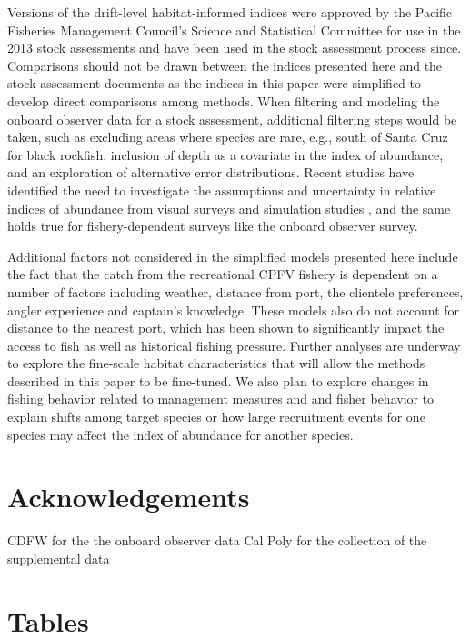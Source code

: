 \documentclass[
  12pt,
  authoryear,
  preprint,
  3p]{elsarticle}
\begin{document}
Versions of the drift-level habitat-informed indices were approved by
the Pacific Fisheries Management Council's Science and Statistical
Committee for use in the 2013 stock assessments and have been used in
the stock assessment process since. Comparisons should not be drawn
between the indices presented here and the stock assessment documents as
the indices in this paper were simplified to develop direct comparisons
among methods. When filtering and modeling the onboard observer data for
a stock assessment, additional filtering steps would be taken, such as
excluding areas where species are rare, e.g., south of Santa Cruz for
black rockfish, inclusion of depth as a covariate in the index of
abundance, and an exploration of alternative error distributions. Recent
studies have identified the need to investigate the assumptions and
uncertainty in relative indices of abundance from visual surveys
\citep{Bacheler:2015:ERA, Campbell:2015:CRA} and simulation studies
\citep{Siegfried:2016:ISA}, and the same holds true for
fishery-dependent surveys like the onboard observer survey.

Additional factors not considered in the simplified models presented
here include the fact that the catch from the recreational CPFV fishery
is dependent on a number of factors including weather, distance from
port, the clientele preferences, angler experience and captain's
knowledge. These models also do not account for distance to the nearest
port, which has been shown to significantly impact the access to fish as
well as historical fishing pressure. Further analyses are underway to
explore the fine-scale habitat characteristics that will allow the
methods described in this paper to be fine-tuned. We also plan to
explore changes in fishing behavior related to management measures and
and fisher behavior to explain shifts among target species or how large
recruitment events for one species may affect the index of abundance for
another species.

\hypertarget{acknowledgements}{%
\section{Acknowledgements}\label{acknowledgements}}

CDFW for the the onboard observer data Cal Poly for the collection of
the supplemental data

\hypertarget{tables}{%
\section{Tables}\label{tables}}
\end{document}
